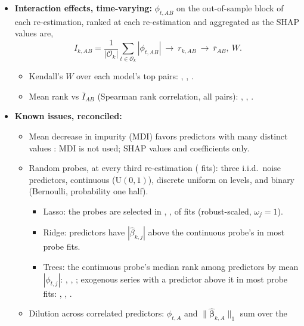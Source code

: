 \begin{itemize}
\begin{itemize}
    \rhfiXgbHColTop, \rhfiXgbHMinColTop; random forest \rhfiRfHColTop, \rhfiRfHMinColTop.
  \end{itemize}
\item \textbf{Interaction effects, time-varying:} $\phi_{t,AB}$ on the out-of-sample block of each re-estimation,
  ranked at each re-estimation and aggregated as the SHAP values are,
  \[
    I_{k,AB} = \frac{1}{|\mathcal O_k|} \sum_{t \in \mathcal O_k} |\phi_{t,AB}| \ \to\ r_{k,AB} \ \to\ \bar r_{AB},\ W .
  \]
  \begin{itemize}
  \item Kendall's $W$ over each model's top \rhfiTopWPairs{} pairs: \rhfiLgbmInterW, \rhfiXgbInterW, \rhfiRfInterW.
  \item Mean rank vs $\bar I_{AB}$ (Spearman rank correlation, all pairs): \rhfiLgbmInterSpGlobal,
    \rhfiXgbInterSpGlobal, \rhfiRfInterSpGlobal.
  \end{itemize}
\item \textbf{Known issues, reconciled:}
  \begin{itemize}
  \item Mean decrease in impurity (MDI) favors predictors with many distinct values
    \citep{StroblBoulesteixZeileisHothorn2007}: MDI is not used; SHAP values and coefficients only.
  \item Random probes, at every third re-estimation (\rhfiNProbe{} fits): three i.i.d.\ noise predictors, continuous
    ($\mathrm{U}(0,1)$), discrete uniform on \rhfiProbeLevels{} levels, and binary (Bernoulli, probability one half).
    \begin{itemize}
    \item Lasso: the probes are selected in \rhfiLassoProbeSel, \rhfiLassoProbeSelLevels, \rhfiLassoProbeSelBinary{}
      of \rhfiNProbe{} fits (robust-scaled, $\omega_j = 1$).
    \item Ridge: \rhfiRidgeProbeBeat{} predictors have $|\hat\beta_{k,j}|$ above the continuous probe's in most probe
      fits.
    \item Trees: the continuous probe's median rank among \rhfiNProbeCols{} predictors by mean $|\phi_{t,j}|$:
      \rhfiLgbmProbeRank,
      \rhfiXgbProbeRank, \rhfiRfProbeRank; exogenous series with a predictor above it in most probe fits:
      \rhfiLgbmProbeSeries, \rhfiXgbProbeSeries, \rhfiRfProbeSeries.
    \end{itemize}
  \item Dilution across correlated predictors: $\phi_{t,A}$ and $\lVert\hat{\bm\beta}_{k,A}\rVert_1$ sum over the

\end{itemize}
\end{itemize}
